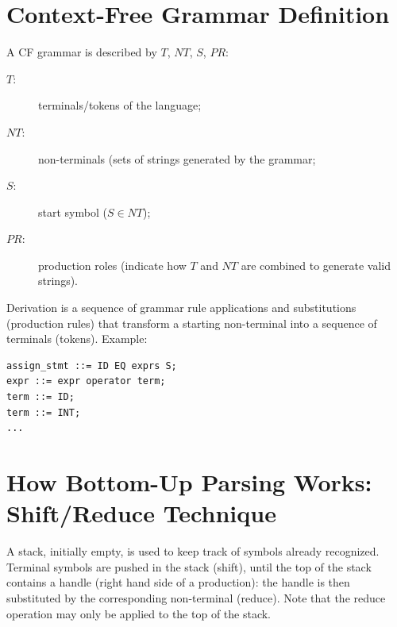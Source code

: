 \section{Context-Free Grammar Definition}
A CF grammar is described by $T$, $NT$, $S$, $PR$:
\begin{description}
    \item[$T$:] terminals/tokens of the language;
    \item[$NT$:] non-terminals (sets of strings generated by the grammar;
    \item[$S$:] start symbol ($S \in NT$);
    \item[$PR$:] production roles (indicate how $T$ and $NT$ are combined to generate valid strings).
\end{description}

Derivation is a sequence of grammar rule applications and substitutions (production rules) that transform a starting non-terminal into a sequence of terminals (tokens).
Example:
\begin{lstlisting}
assign_stmt ::= ID EQ exprs S;
expr ::= expr operator term;
term ::= ID;
term ::= INT;
...
\end{lstlisting}

\section{How Bottom-Up Parsing Works: Shift/Reduce Technique}
A stack, initially empty, is used to keep track of symbols already recognized.
Terminal symbols are pushed in the stack (shift), until the top of the stack contains a handle (right hand side of a production): the handle is then substituted by the corresponding non-terminal (reduce).
Note that the reduce operation may only be applied to the top of the stack.

